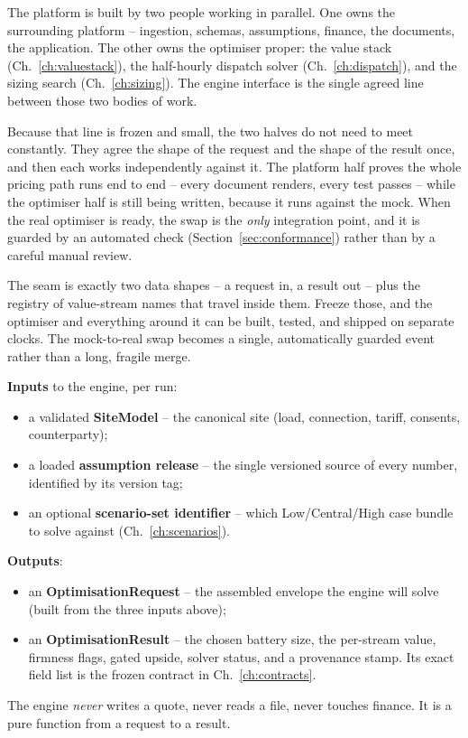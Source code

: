 The platform is built by two people working in parallel. One owns the surrounding platform -- ingestion, schemas, assumptions, finance, the documents, the application. The other owns the optimiser proper: the value stack (Ch.~\ref{ch:valuestack}), the half-hourly dispatch solver (Ch.~\ref{ch:dispatch}), and the sizing search (Ch.~\ref{ch:sizing}). The engine interface is the single agreed line between those two bodies of work.

Because that line is frozen and small, the two halves do not need to meet constantly. They agree the shape of the request and the shape of the result once, and then each works independently against it. The platform half proves the whole pricing path runs end to end -- every document renders, every test passes -- while the optimiser half is still being written, because it runs against the mock. When the real optimiser is ready, the swap is the \emph{only} integration point, and it is guarded by an automated check (Section~\ref{sec:conformance}) rather than by a careful manual review.

\begin{keyidea}
The seam is exactly two data shapes -- a request in, a result out -- plus the registry of value-stream names that travel inside them. Freeze those, and the optimiser and everything around it can be built, tested, and shipped on separate clocks. The mock-to-real swap becomes a single, automatically guarded event rather than a long, fragile merge.
\end{keyidea}

\begin{contract}
\textbf{Inputs} to the engine, per run:
\begin{itemize}
  \item a validated \textbf{SiteModel} -- the canonical site (load, connection, tariff, consents, counterparty);
  \item a loaded \textbf{assumption release} -- the single versioned source of every number, identified by its version tag;
  \item an optional \textbf{scenario-set identifier} -- which Low/Central/High case bundle to solve against (Ch.~\ref{ch:scenarios}).
\end{itemize}
\textbf{Outputs}:
\begin{itemize}
  \item an \textbf{OptimisationRequest} -- the assembled envelope the engine will solve (built from the three inputs above);
  \item an \textbf{OptimisationResult} -- the chosen battery size, the per-stream value, firmness flags, gated upside, solver status, and a provenance stamp. Its exact field list is the frozen contract in Ch.~\ref{ch:contracts}.
\end{itemize}
The engine \emph{never} writes a quote, never reads a file, never touches finance. It is a pure function from a request to a result.
\end{contract}

